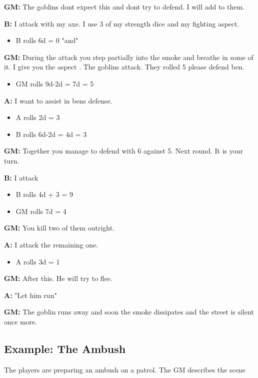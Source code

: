 \documentclass[11pt]{article}
\begin{document}
{\textbf{GM:} The goblins dont expect this and dont try to defend. I will add  to them.

\textbf{B:} I attack with my axe. I use 3 of my strength dice and my fighting aspect.
\begin{itemize}
\item B rolls 6d = 0 "and"
\end{itemize}

\textbf{GM:} During the attack you step partially into the smoke and breathe in some of it. I give you the aspect . The goblins attack. They rolled 5 please defend ben.
\begin{itemize}
\item GM rolls 9d-2d = 7d = 5
\end{itemize}

\textbf{A:} I want to assist in bens defense.
\begin{itemize}
\item A rolls 2d = 3
\item B rolls 6d-2d = 4d = 3
\end{itemize}

\textbf{GM:} Together you manage to defend with 6 against 5. Next round. It is your turn.

\textbf{B:} I attack
\begin{itemize}
\item B rolls 4d + 3 = 9
\item GM rolls 7d = 4
\end{itemize}

\textbf{GM:} You kill two of them outright.

\textbf{A:} I attack the remaining one.
\begin{itemize}
\item A rolls 3d = 1
\end{itemize}

\textbf{GM:} After this. He will try to flee.

\textbf{A:} "Let him run"

\textbf{GM:} The goblin runs away and soon the smoke dissipates and the street is silent once more.

\subsection{Example: The Ambush}
\label{sec:org4d19697}

The players are preparing an ambush on a patrol. The GM describes the scene

}
\end{document}
